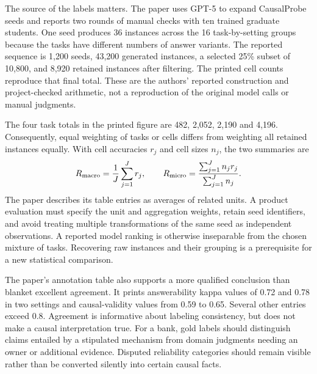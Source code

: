 The source of the labels matters. The paper uses GPT-5 to expand CausalProbe seeds and reports two rounds of manual checks with ten trained graduate students. One seed produces 36 instances across the 16 task-by-setting groups because the tasks have different numbers of answer variants. The reported sequence is 1,200 seeds, 43,200 generated instances, a selected 25\% subset of 10,800, and 8,920 retained instances after filtering. The printed cell counts reproduce that final total. These are the authors' reported construction and project-checked arithmetic, not a reproduction of the original model calls or manual judgments.~\citep{exec21_causalitycheck,exec21_causalitycheck_reference}

The four task totals in the printed figure are 482, 2,052, 2,190 and 4,196. Consequently, equal weighting of tasks or cells differs from weighting all retained instances equally. With cell accuracies $r_j$ and cell sizes $n_j$, the two summaries are
\begin{equation}
 R_{\rm macro}=\frac{1}{J}\sum_{j=1}^J r_j,
 \qquad
 R_{\rm micro}=\frac{\sum_{j=1}^J n_j r_j}{\sum_{j=1}^J n_j}.
 \label{exec21:check-weights}
\end{equation}
The paper describes its table entries as averages of related units. A product evaluation must specify the unit and aggregation weights, retain seed identifiers, and avoid treating multiple transformations of the same seed as independent observations. A reported model ranking is otherwise inseparable from the chosen mixture of tasks. Recovering raw instances and their grouping is a prerequisite for a new statistical comparison.~\citep{exec21_causalitycheck,exec21_causalitycheck_reference}

The paper's annotation table also supports a more qualified conclusion than blanket excellent agreement. It prints answerability kappa values of 0.72 and 0.78 in two settings and causal-validity values from 0.59 to 0.65. Several other entries exceed 0.8. Agreement is informative about labeling consistency, but does not make a causal interpretation true. For a bank, gold labels should distinguish claims entailed by a stipulated mechanism from domain judgments needing an owner or additional evidence. Disputed reliability categories should remain visible rather than be converted silently into certain causal facts.~\citep{exec21_causalitycheck}

